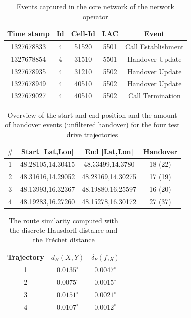 \documentclass[twocolumn]{bmcart}%
\begin{document}
\begin{backmatter}
\begin{table}[h]
\caption{Events captured in the core network of the network operator}
\begin{tabular}{|c|c|c|c|c|}
\hline
Time stamp & Id & Cell-Id & LAC  & Event              \\ \hline
1327678833 & 4  & 51520   & 5501 & Call Establishment \\
1327678854 & 4  & 31510   & 5501 & Handover Update    \\
1327678935 & 4  & 31210   & 5502 & Handover Update    \\
1327678949 & 4  & 40510   & 5502 & Handover Update    \\
1327679027 & 4  & 40510   & 5502 & Call Termination  \\ \hline
\end{tabular}
\label{table:events}
\end{table}

\begin{table}[h]
\caption{Overview of the start and end position and the amount of handover events (unfiltered handover) for the four test drive trajectories}
\begin{tabular}{|c|c|c|c|}
\hline
\textbf{$\#$} & \textbf{Start [Lat,Lon]}& \textbf{End [Lat,Lon]}& \textbf{Handover}                \\ \hline
1 &  48.28105,14.30415   & 48.33499,14.3780 & 18 (22) \\ %
2 &  48.31616,14.29052   & 48.28169,14.30275 & 17 (19)   \\  %
3 &  48.13993,16.32367  & 48.19880,16.25597& 16 (20)    \\ %
4 &  48.19283,16.27260   & 48.15278,16.30172 & 27 (37)   \\  \hline %
\end{tabular}
\label{table:tracks}
\end{table}


\begin{table}[h]
\caption{The route similarity computed with the discrete Hausdorff distance and the Fr\'{e}chet distance}
\begin{tabular}{|c|c|c|}
\hline
\textbf{Trajectory} & \textbf{$d_{H}(X,Y)$ }& \textbf{$\delta_F(f,g)$}  \\ \hline
1 &   $0.0135^\circ$ & $0.0047^\circ$   \\ %
2 &   $0.0075^\circ$ & $0.0015^\circ$  \\  %
3 &  $0.0151^\circ$  &  $0.0021^\circ$   \\ %
4 &  $0.0107^\circ$ & $0.0012^\circ$  \\  \hline %
\end{tabular}
\label{table:routesim}
\end{table}


\end{backmatter}
\end{document}
